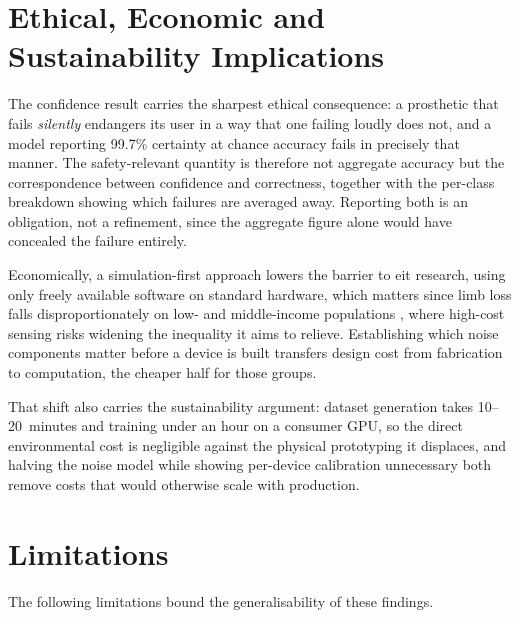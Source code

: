 \section{Ethical, Economic and Sustainability Implications}
\label{sec:disc-ethics}

The confidence result carries the sharpest ethical consequence: a prosthetic that fails \emph{silently} endangers its user in a way that one failing loudly does not, and a model reporting 99.7\% certainty at chance accuracy fails in precisely that manner. The safety-relevant quantity is therefore not aggregate accuracy but the correspondence between confidence and correctness, together with the per-class breakdown showing which failures are averaged away. Reporting both is an obligation, not a refinement, since the aggregate figure alone would have concealed the failure entirely.

Economically, a simulation-first approach lowers the barrier to \gls{eit} research, using only freely available software on standard hardware, which matters since limb loss falls disproportionately on low- and middle-income populations \parencite{mcdonald2021}, where high-cost sensing risks widening the inequality it aims to relieve. Establishing which noise components matter before a device is built transfers design cost from fabrication to computation, the cheaper half for those groups.

That shift also carries the sustainability argument: dataset generation takes 10--20\, minutes and training under an hour on a consumer GPU, so the direct environmental cost is negligible against the physical prototyping it displaces, and halving the noise model while showing per-device calibration unnecessary both remove costs that would otherwise scale with production.

\section{Limitations}
\label{sec:disc-limitations}

The following limitations bound the generalisability of these findings.

